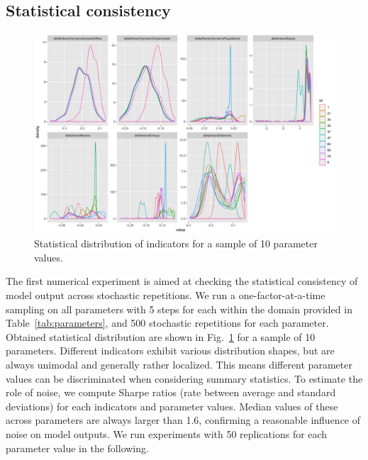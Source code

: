 \documentclass[ijgi,article,submit,moreauthors,pdftex]{Definitions/mdpi}
\begin{document}
\subsection{Statistical consistency}


\begin{figure}[H]
	\includegraphics[width=\linewidth]{figures/allindics_hist.png}
	\caption{Statistical distribution of indicators for a sample of 10 parameter values.\label{fig:fig2}}
\end{figure}


The first numerical experiment is aimed at checking the statistical consistency of model output across stochastic repetitions. We run a one-factor-at-a-time sampling on all parameters with 5 steps for each within the domain provided in Table~\ref{tab:parameters}, and 500 stochastic repetitions for each parameter.%
Obtained statistical distribution are shown in Fig.~\ref{fig:fig2} for a sample of 10 parameters. Different indicators exhibit various distribution shapes, but are always unimodal and generally rather localized. This means different parameter values can be discriminated when considering summary statistics. To estimate the role of noise, we compute Sharpe ratios (rate between average and standard deviations) for each indicators and parameter values. Median values of these across parameters are always larger than 1.6, confirming a reasonable influence of noise on model outputs. We run experiments with 50 replications for each parameter value in the following.
\end{document}
